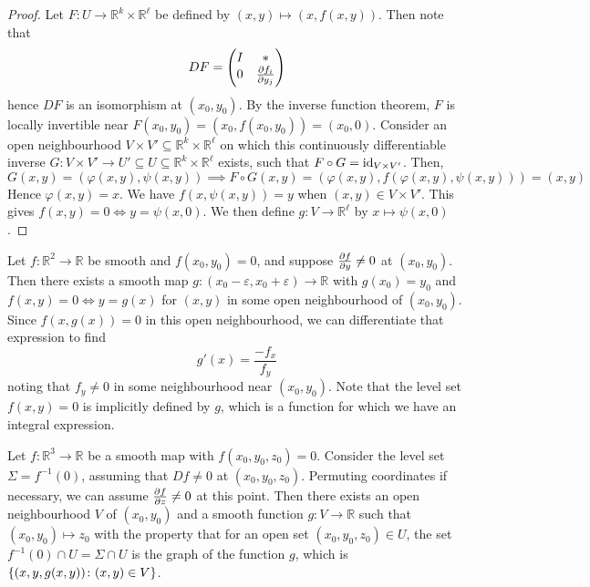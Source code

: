 \begin{proof}
	Let \( F \colon U \to \mathbb R^k \times \mathbb R^\ell \) be defined by \( (x,y) \mapsto (x,f(x,y)) \).
	Then note that
	\[
		DF = \begin{pmatrix}
			I & \ast           \\
			0 & \pdv{f_i}{y_j}
		\end{pmatrix}
	\]
	hence \( DF \) is an isomorphism at \( (x_0, y_0) \).
	By the inverse function theorem, \( F \) is locally invertible near \( F(x_0,y_0) = (x_0,f(x_0,y_0)) = (x_0, 0) \).
	Consider an open neighbourhood \( V \times V' \subseteq \mathbb R^k \times \mathbb R^\ell \) on which this continuously differentiable inverse \( G \colon V \times V' \to U' \subseteq U \subseteq \mathbb R^k \times \mathbb R^\ell \) exists, such that \( F \circ G = \operatorname{id}_{V \times V'} \).
	Then,
	\[
		G(x,y) = (\varphi(x,y), \psi(x,y)) \implies F \circ G(x,y) = (\varphi(x,y), f(\varphi(x,y), \psi(x,y))) = (x,y)
	\]
	Hence \( \varphi(x,y) = x \).
	We have \( f(x,\psi(x,y)) = y \) when \( (x,y) \in V \times V' \).
	This gives \( f(x,y) = 0 \iff y = \psi(x,0) \).
	We then define \( g \colon V \to \mathbb R^\ell \) by \( x \mapsto \psi(x,0) \).
\end{proof}
\begin{example}
	Let \( f \colon \mathbb R^2 \to \mathbb R \) be smooth and \( f(x_0, y_0) = 0 \), and suppose \( \pdv{f}{y} \neq 0 \) at \( (x_0, y_0) \).
	Then there exists a smooth map \( g \colon (x_0 - \varepsilon, x_0 + \varepsilon) \to \mathbb R \) with \( g(x_0) = y_0 \) and \( f(x,y) = 0 \iff y = g(x) \) for \( (x,y) \) in some open neighbourhood of \( (x_0, y_0) \).
	Since \( f(x,g(x)) = 0 \) in this open neighbourhood, we can differentiate that expression to find
	\[
		g'(x) = \frac{-f_x}{f_y}
	\]
	noting that \( f_y \neq 0 \) in some neighbourhood near \( (x_0, y_0) \).
	Note that the level set \( f(x,y) = 0 \) is implicitly defined by \( g \), which is a function for which we have an integral expression.
\end{example}
\begin{example}
	Let \( f \colon \mathbb R^3 \to \mathbb R \) be a smooth map with \( f(x_0, y_0, z_0) = 0 \).
	Consider the level set \( \Sigma = f^{-1}(0) \), assuming that \( Df \neq 0 \) at \( (x_0, y_0, z_0) \).
	Permuting coordinates if necessary, we can assume \( \pdv{f}{z} \neq 0 \) at this point.
	Then there exists an open neighbourhood \( V \) of \( (x_0, y_0) \) and a smooth function \( g \colon V \to \mathbb R \) such that \( (x_0, y_0) \mapsto z_0 \) with the property that for an open set \( (x_0, y_0, z_0) \in U \), the set \( f^{-1}(0) \cap U = \Sigma \cap U \) is the graph of the function \( g \), which is \( \qty{ (x,y,g(x,y)) \colon (x,y) \in V } \).
\end{example}

